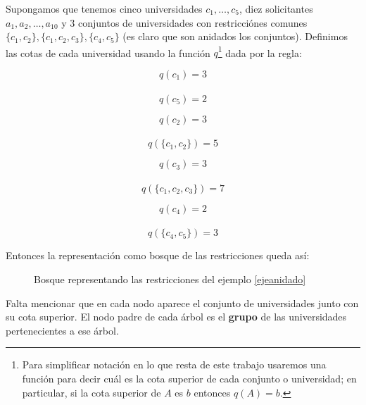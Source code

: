 \begin{eje}\label{ejeanidado}
Supongamos que tenemos cinco universidades $c_1,\dots,c_5$, diez solicitantes $a_1,a_2,\dots,a_{10}$ y 3 conjuntos de universidades con restricciónes comunes $\{c_1,c_2\},\{c_1,c_2,c_3\},\{c_4,c_5\}$ (es claro que son anidados los conjuntos). Definimos las cotas de cada universidad usando la función $q$\footnote{Para simplificar notación en lo que resta de este trabajo usaremos una función para decir cuál es la cota superior de cada conjunto o universidad; en particular, si la cota superior de $A$ es $b$ entonces $q(A)=b$.} dada por la regla:

 \begin{minipage}{.25\linewidth}
$$q(c_1)=3$$ \\
$$q(c_5)=2$$ 
\end{minipage}%
\begin{minipage}{.25\linewidth}
$$q(c_2)=3$$ \\
$$q(\{c_1,c_2\})=5$$ 
\end{minipage}
\begin{minipage}{.25\linewidth}
$$q(c_3)=3$$ \\
$$q(\{c_1,c_2,c_3\})=7$$ 
\end{minipage}
\begin{minipage}{.25\linewidth}
$$q(c_4)=2$$ \\
$$q(\{c_4,c_5\})=3$$ 
\end{minipage}

Entonces la representación como bosque de las restricciones queda así:

\begin{figure}[H]
\noindent \begin{minipage}{.5\linewidth}
\centering
{}
\end{minipage}%
 \begin{minipage}{.5\linewidth}
\centering
{}
\end{minipage}%
\caption{Bosque representando las restricciones del ejemplo \ref{ejeanidado}}
\end{figure}
Falta mencionar que en cada nodo aparece el conjunto de universidades junto con su cota superior. El nodo padre de cada árbol es el \textbf{grupo} de las universidades pertenecientes a ese árbol.

\fin
\end{eje}

